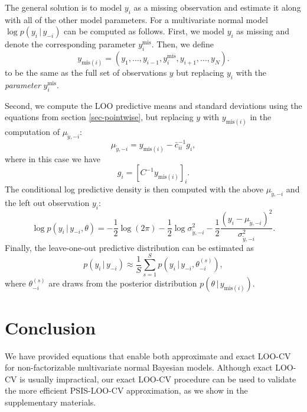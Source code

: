 \documentclass[11pt]{article}
\begin{document}
The general solution is to model $y_i$ as a missing observation and estimate it
along with all of the other model parameters. For a multivariate normal model
$\log p(y_i\,|\,y_{-i})$ can be computed as follows. First, we model $y_i$ as
missing and denote the corresponding parameter $y_i^{\mathrm{mis}}$. Then, we
define
%
\begin{equation}
y_{\mathrm{mis}(i)} = (y_1, \ldots, y_{i-1}, y_i^{\mathrm{mis}}, y_{i+1}, \ldots, y_N).
\end{equation}
%
to be the same as the full set of observations $y$ but replacing $y_i$ with
the \emph{parameter} $y_i^{\mathrm{mis}}$.

Second, we compute the LOO predictive means and standard deviations using the
equations from section \ref{sec-pointwise}, but replacing $y$ with
$y_{\mathrm{mis}(i)}$ in the computation of $\mu_{\tilde{y},-i}$:
%
\begin{equation}
\mu_{\tilde{y},-i} = y_{{\mathrm{mis}}(i)}-\bar{c}_{ii}^{-1}g_i,
\end{equation}
%
where in this case we have
%
\begin{equation}
g_i = \left[ C^{-1} y_{\mathrm{mis}(i)} \right]_i.
\end{equation}
%
The conditional log predictive density is then computed with the above
$\mu_{\tilde{y},-i}$ and the left out observation $y_i$:
%
\begin{equation}
  \log p(y_i\,|\,y_{-i},\theta)
  = - \frac{1}{2}\log(2\pi)
  - \frac{1}{2}\log \sigma^2_{\tilde{y},-i}
  - \frac{1}{2}\frac{(y_i-\mu_{\tilde{y},-i})^2}{\sigma^2_{\tilde{y},-i}}.
\end{equation}
%
Finally, the leave-one-out predictive distribution can be estimated as
%
\begin{equation}
 p(y_i\,|\,y_{-i}) \approx \frac{1}{S} \sum_{s=1}^S p(y_i\,|\,y_{-i}, \theta_{-i}^{(s)}),
\end{equation}
%
where $\theta_{-i}^{(s)}$ are draws from the posterior distribution
$p(\theta\,|\,y_{\mathrm{mis}(i)})$.


\section{Conclusion}

We have provided equations that enable both approximate and exact LOO-CV for
non-factorizable multivariate normal Bayesian models. Although exact LOO-CV is
usually impractical, our exact LOO-CV procedure can be used to validate the more
efficient PSIS-LOO-CV approximation, as we show in the supplementary materials.
\end{document}
